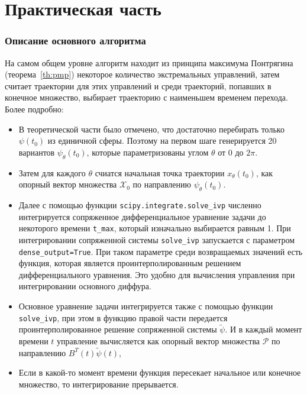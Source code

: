 \documentclass[12pt, a4paper]{article} %
\begin{document}
\part{Практическая часть}

\section{Описание основного алгоритма}

На самом общем уровне алгоритм находит из принципа максимума 
Понтрягина (теорема~\ref{th:pmp})
некоторое количество экстремальных управлений, 
затем считает траектории для этих управлений и среди траекторий, попавших 
в конечное множество, выбирает траекторию с наименьшем временем перехода.
Более подробно:
\begin{itemize}
    \item В теоретической части было отмечено, что достаточно перебирать 
        только $\psi(t_0)$ из единичной сферы.
        Поэтому на первом шаге генерируется 20 вариантов  $\psi_\theta(t_0)$, 
        которые параметризованы углом $\theta$ от $0$ до  $2\pi$.
    \item Затем для каждого $\theta$ счиатся начальная точка траектории
        $x_\theta(t_0)$,
        как опорный вектор множества $\mathcal{X}_0$ по направлению
        $\psi_\theta(t_0)$.
    \item Далее с помощью функции \texttt{scipy.integrate.solve\_ivp} 
        численно интегрируется сопряженное дифференциальное уравнение 
        задачи до некоторого времени 
        \texttt{t\_max}, который изначально выбирается равным 1.
        При интегрировании сопряженной системы \texttt{solve\_ivp}
        запускается с параметром \texttt{dense\_output=True}.
        При таком параметре среди возвращаемых значений есть 
        функция, которая является проинтерполированным решением 
        дифференциального уравнения. 
        Это удобно для вычисления управления при интегрировании основного 
        диффура.
    \item Основное уравнение задачи интегрируется также с помощью функции 
        \texttt{solve\_ivp}, при этом в функцию правой части передается
        проинтерполированное решение сопряженной системы $\tilde\psi$.
        И в каждый момент времени $t$ управление вычисляется как опорный 
        вектор множества $\mathcal{P}$ по направлению $B^T(t)\tilde\psi(t)$,
    \item Если в какой-то момент времени функция пересекает начальное или 
        конечное множество, то интегрирование прерывается.

\end{itemize}
\end{document}
